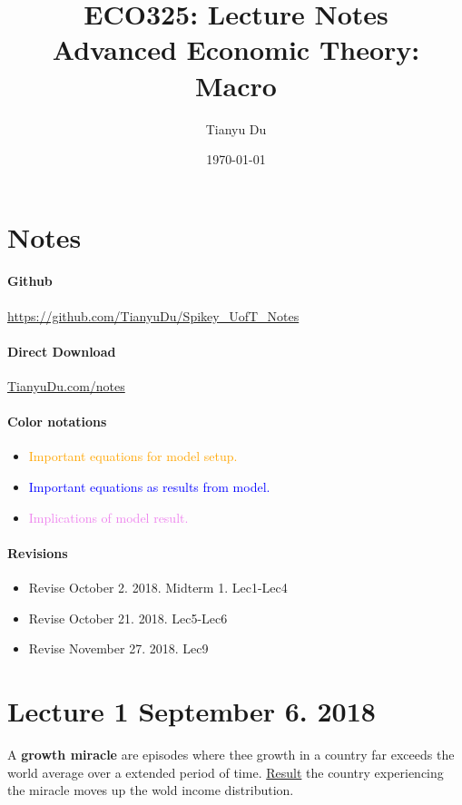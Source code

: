 \documentclass[11pt]{article}
\title{ECO325: Lecture Notes \\ \small Advanced Economic Theory: Macro}
\author{Tianyu Du}
\date{\today}
\begin{document}
    \maketitle
    \doclicenseThis
    \section*{Notes}
    	\paragraph{Github} \url{https://github.com/TianyuDu/Spikey_UofT_Notes}
    	\paragraph{Direct Download} \url{TianyuDu.com/notes}
    	\paragraph{Color notations}
    		\begin{itemize}
    			\item \textcolor{orange}{Important equations for model setup.}
    			\item \textcolor{blue}{Important equations as results from model.}
    			\item \textcolor{violet}{Implications of model result.}
    		\end{itemize}
    \paragraph{Revisions}
    \begin{itemize}
    	\item Revise October 2. 2018. Midterm 1. Lec1-Lec4
    	\item Revise October 21. 2018. Lec5-Lec6
    	\item Revise November 27. 2018. Lec9
    \end{itemize}
    \tableofcontents
    \newpage
    
    \section{Lecture 1 September 6. 2018}
        \begin{definition}
            A \textbf{growth miracle} are episodes where thee growth in a country far exceeds the world average over a extended period of time. \ul{Result} the country experiencing the miracle moves up the wold income distribution.
        \end{definition}
        
\end{document}
